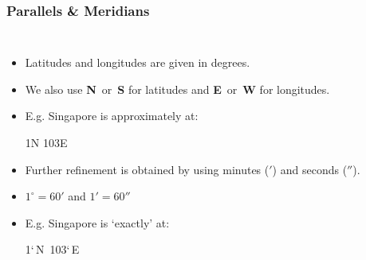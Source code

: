 \begin{frame}
\frametitle{Parallels \& Meridians}
\begin{columns}
	\begin{itemize}
		\item Latitudes and longitudes are given in degrees.
		\item We also use \textbf{N}~or~\textbf{S} for latitudes and \textbf{E}~or~\textbf{W} for longitudes.
		\item E.g. Singapore is approximately at:  
		\begin{center}
			1\degree N 103\degree E
		\end{center}
		\item Further refinement is obtained by using minutes ($'$) and seconds ($''$).
		\item $1^{\circ} = 60'$ and $1' = 60''$
		\item E.g. Singapore is `exactly' at: 
		\begin{center}
			1`\,N~103`\,E
		\end{center}
	\end{itemize}
	
	\bigskip
	
\end{columns}
\end{frame}


